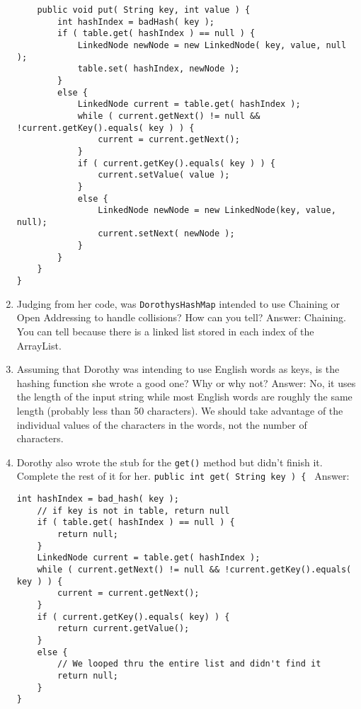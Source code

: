 \documentclass[11pt]{article}
\newenvironment{answer}{\large\lstset{basicstyle=\large}\color{white} \small{Answer:}\large}{}
\newenvironment{answer}{\large\lstset{basicstyle=\large}\color{red} \small{Answer:}\large}{}
\begin{document}
\begin{enumerate}
\begin{lstlisting}
	public void put( String key, int value ) {
		int hashIndex = badHash( key );
		if ( table.get( hashIndex ) == null ) {
			LinkedNode newNode = new LinkedNode( key, value, null );
			table.set( hashIndex, newNode );
		}
		else {
			LinkedNode current = table.get( hashIndex );
			while ( current.getNext() != null && !current.getKey().equals( key ) ) {
				current = current.getNext();
			}
			if ( current.getKey().equals( key ) ) {
				current.setValue( value );
			}
			else {
				LinkedNode newNode = new LinkedNode(key, value, null);
				current.setNext( newNode );
			}
		}
	}
}
\end{lstlisting}



\item Judging from her code, was {\tt DorothysHashMap} intended to use Chaining or Open Addressing to handle collisions? How can you tell?
\begin{answer}
Chaining. You can tell because there is a linked list stored in each index of the ArrayList.
\end{answer}



\item Assuming that Dorothy was intending to use English words as keys, is the hashing function she wrote a good one? Why or why not?
\begin{answer}
No, it uses the length of the input string while most English words are roughly the same length (probably less than 50 characters). We should take advantage of the individual values of the characters in the words, not the number of characters.  
\end{answer}



\item Dorothy also wrote the stub for the {\tt get()} method but didn't finish it. Complete the rest of it for her.
{\tt public int get( String key ) \{ }
\begin{answer} 
	\begin{lstlisting}
int hashIndex = bad_hash( key );
	// if key is not in table, return null
	if ( table.get( hashIndex ) == null ) {
		return null;
	}
	LinkedNode current = table.get( hashIndex );
	while ( current.getNext() != null && !current.getKey().equals( key ) ) {
		current = current.getNext();
	}
	if ( current.getKey().equals( key) ) {
		return current.getValue();
	}
	else {
		// We looped thru the entire list and didn't find it
		return null;
	}
}
	\end{lstlisting}
\end{answer}



\end{enumerate}
\end{document}
